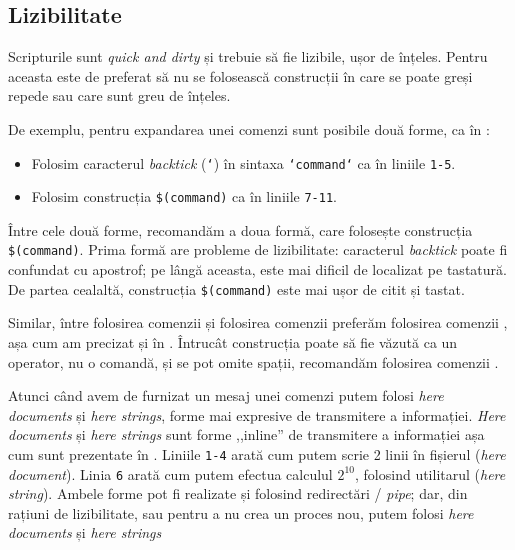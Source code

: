 \subsection{Lizibilitate}
\label{sec:auto:script-advanced:readable}

Scripturile sunt \textit{quick and dirty} și trebuie să fie lizibile, ușor de înțeles.
Pentru aceasta este de preferat să nu se folosească construcții în care se poate greși repede sau care sunt greu de înțeles.

De exemplu, pentru expandarea unei comenzi sunt posibile două forme, ca în :
\begin{itemize}
  \item Folosim caracterul \textit{backtick} (\texttt{`}) în sintaxa \texttt{`command`} ca în liniile \texttt{1-5}.
  \item Folosim construcția \texttt{\$(command)} ca în liniile \texttt{7-11}.
\end{itemize}
Între cele două forme, recomandăm a doua formă, care folosește construcția \texttt{\$(command)}.
Prima formă are probleme de lizibilitate: caracterul \textit{backtick} poate fi confundat cu apostrof; pe lângă aceasta, este mai dificil de localizat pe tastatură.
De partea cealaltă, construcția \texttt{\$(command)} este mai ușor de citit și tastat.


Similar, între folosirea comenzii  și folosirea comenzii \cmd{$[$} preferăm folosirea comenzii , așa cum am precizat și în .
Întrucât construcția \cmd{$[$} poate să fie văzută ca un operator, nu o comandă, și se pot omite spații, recomandăm folosirea comenzii .

Atunci când avem de furnizat un mesaj unei comenzi putem folosi \textit{here documents} și \textit{here strings}, forme mai expresive de transmitere a informației.
\textit{Here documents} și \textit{here strings} sunt forme ,,inline'' de transmitere a informației așa cum sunt prezentate în .
Liniile \texttt{1-4} arată cum putem scrie 2 linii în fișierul  (\textit{here document}).
Linia \texttt{6} arată cum putem efectua calculul $2^{10}$, folosind utilitarul  (\textit{here string}).
Ambele forme pot fi realizate și folosind redirectări / \textit{pipe}; dar, din rațiuni de lizibilitate, sau pentru a nu crea un proces nou, putem folosi \textit{here documents} și \textit{here strings}


